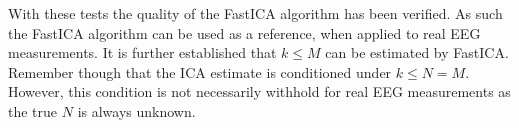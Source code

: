 \noindent
With these tests the quality of the FastICA algorithm has been verified. 
As such the FastICA algorithm can be used as a reference, when applied to real EEG measurements. 
It is further established that $k \leq M$ can be estimated by FastICA. 
Remember though that the ICA estimate is conditioned under $k \leq N = M$.
However, this condition is not necessarily withhold for real EEG measurements as the true $N$ is always unknown.  